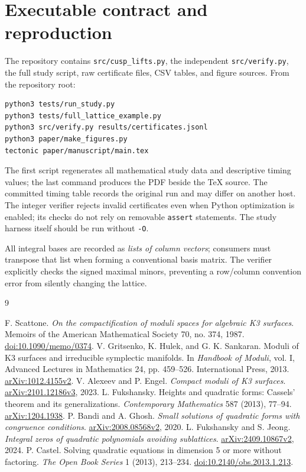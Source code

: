 \documentclass[11pt]{article}
\theoremstyle{remark}\newtheorem{remark}[theorem]{Remark}
\begin{document}
\appendix
\section{Executable contract and reproduction}
The repository contains \texttt{src/cusp\_lifts.py}, the independent \texttt{src/verify.py}, the full study script, raw certificate files, CSV tables, and figure sources. From the repository root:
\begin{verbatim}
python3 tests/run_study.py
python3 tests/full_lattice_example.py
python3 src/verify.py results/certificates.jsonl
python3 paper/make_figures.py
tectonic paper/manuscript/main.tex
\end{verbatim}
The first script regenerates all mathematical study data and descriptive timing values; the last command produces the PDF beside the TeX source. The committed timing table records the original run and may differ on another host. The integer verifier rejects invalid certificates even when Python optimization is enabled; its checks do not rely on removable \texttt{assert} statements. The study harness itself should be run without \texttt{-O}.

All integral bases are recorded as \emph{lists of column vectors}; consumers must transpose that list when forming a conventional basis matrix. The verifier explicitly checks the signed maximal minors, preventing a row/column convention error from silently changing the lattice.

\begin{thebibliography}{9}
\small\raggedright\setlength{\itemsep}{0pt}
 F. Scattone. \emph{On the compactification of moduli spaces for algebraic K3 surfaces}. Memoirs of the American Mathematical Society 70, no. 374, 1987. \href{https://doi.org/10.1090/memo/0374}{doi:10.1090/memo/0374}.
 V. Gritsenko, K. Hulek, and G. K. Sankaran. Moduli of K3 surfaces and irreducible symplectic manifolds. In \emph{Handbook of Moduli}, vol. I, Advanced Lectures in Mathematics 24, pp. 459--526. International Press, 2013. \href{https://arxiv.org/abs/1012.4155}{arXiv:1012.4155v2}.
 V. Alexeev and P. Engel. \emph{Compact moduli of K3 surfaces}. \href{https://arxiv.org/abs/2101.12186}{arXiv:2101.12186v3}, 2023.
 L. Fukshansky. Heights and quadratic forms: Cassels' theorem and its generalizations. \emph{Contemporary Mathematics} 587 (2013), 77--94. \href{https://arxiv.org/abs/1204.1938}{arXiv:1204.1938}.
 P. Bandi and A. Ghosh. \emph{Small solutions of quadratic forms with congruence conditions}. \href{https://arxiv.org/abs/2008.08568}{arXiv:2008.08568v2}, 2020.
 L. Fukshansky and S. Jeong. \emph{Integral zeros of quadratic polynomials avoiding sublattices}. \href{https://arxiv.org/abs/2409.10867}{arXiv:2409.10867v2}, 2024.
 P. Castel. Solving quadratic equations in dimension 5 or more without factoring. \emph{The Open Book Series} 1 (2013), 213--234. \href{https://doi.org/10.2140/obs.2013.1.213}{doi:10.2140/obs.2013.1.213}.
\end{thebibliography}
\end{document}
